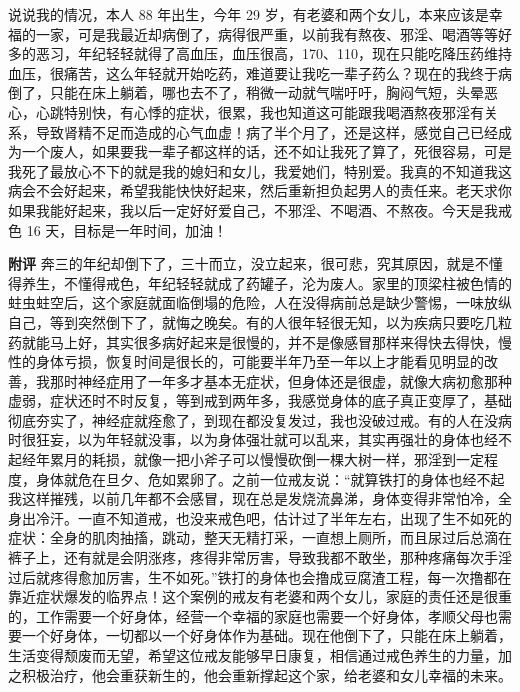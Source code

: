 \begin{case}
    说说我的情况，本人 88 年出生，今年 29 岁，有老婆和两个女儿，本来应该是幸福的一家，可是我最近却病倒了，病得很严重，以前我有熬夜、邪淫、喝酒等等好多的恶习，年纪轻轻就得了高血压，血压很高，170、110，现在只能吃降压药维持血压，很痛苦，这么年轻就开始吃药，难道要让我吃一辈子药么？现在的我终于病倒了，只能在床上躺着，哪也去不了，稍微一动就气喘吁吁，胸闷气短，头晕恶心，心跳特别快，有心悸的症状，很累，我也知道这可能跟我喝酒熬夜邪淫有关系，导致肾精不足而造成的心气血虚！病了半个月了，还是这样，感觉自己已经成为一个废人，如果要我一辈子都这样的话，还不如让我死了算了，死很容易，可是我死了最放心不下的就是我的媳妇和女儿，我爱她们，特别爱。我真的不知道我这病会不会好起来，希望我能快快好起来，然后重新担负起男人的责任来。老天求你如果我能好起来，我以后一定好好爱自己，不邪淫、不喝酒、不熬夜。今天是我戒色 16 天，目标是一年时间，加油！

    \textbf{附评} 奔三的年纪却倒下了，三十而立，没立起来，很可悲，究其原因，就是不懂得养生，不懂得戒色，年纪轻轻就成了药罐子，沦为废人。家里的顶梁柱被色情的蛀虫蛀空后，这个家庭就面临倒塌的危险，人在没得病前总是缺少警惕，一味放纵自己，等到突然倒下了，就悔之晚矣。有的人很年轻很无知，以为疾病只要吃几粒药就能马上好，其实很多病好起来是很慢的，并不是像感冒那样来得快去得快，慢性的身体亏损，恢复时间是很长的，可能要半年乃至一年以上才能看见明显的改善，我那时神经症用了一年多才基本无症状，但身体还是很虚，就像大病初愈那种虚弱，症状还时不时反复，等到戒到两年多，我感觉身体的底子真正变厚了，基础彻底夯实了，神经症就痊愈了，到现在都没复发过，我也没破过戒。有的人在没病时很狂妄，以为年轻就没事，以为身体强壮就可以乱来，其实再强壮的身体也经不起经年累月的耗损，就像一把小斧子可以慢慢砍倒一棵大树一样，邪淫到一定程度，身体就危在旦夕、危如累卵了。之前一位戒友说：“就算铁打的身体也经不起我这样摧残，以前几年都不会感冒，现在总是发烧流鼻涕，身体变得非常怕冷，全身出冷汗。一直不知道戒，也没来戒色吧，估计过了半年左右，出现了生不如死的症状：全身的肌肉抽搐，跳动，整天无精打采，一直想上厕所，而且尿过后总滴在裤子上，还有就是会阴涨疼，疼得非常厉害，导致我都不敢坐，那种疼痛每次手淫过后就疼得愈加厉害，生不如死。”铁打的身体也会撸成豆腐渣工程，每一次撸都在靠近症状爆发的临界点！这个案例的戒友有老婆和两个女儿，家庭的责任还是很重的，工作需要一个好身体，经营一个幸福的家庭也需要一个好身体，孝顺父母也需要一个好身体，一切都以一个好身体作为基础。现在他倒下了，只能在床上躺着，生活变得颓废而无望，希望这位戒友能够早日康复，相信通过戒色养生的力量，加之积极治疗，他会重获新生的，他会重新撑起这个家，给老婆和女儿幸福的未来。
\end{case}

